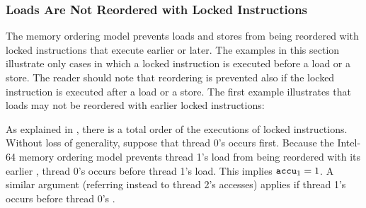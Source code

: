\newpage

\subsubsection*{Loads Are Not Reordered with Locked Instructions}

The memory ordering model prevents loads and stores from being reordered with locked instructions that execute earlier or later.
The examples in this section illustrate only cases in which a locked instruction is executed before a load or a store.
The reader should note that reordering is prevented also if the locked instruction is executed after a load or a store.
\bigbreak
\noindent
The first example illustrates that loads may not be reordered with earlier locked instructions:

\begin{table}[!hbt]
\noindent{}
\caption[Loads Are not Reordered with Locks]{Loads Are not Reordered with Locks \cite[Example 8-9]{ref:Intel}}
\label{tbl:litmus:intel:9}
\end{table}

\noindent
As explained in \cite[Section 8.2.3.8]{ref:Intel}, there is a total order of the executions of locked instructions.
Without loss of generality, suppose that thread 0’s  occurs first.
\bigbreak
\noindent
Because the Intel-64 memory ordering model prevents thread 1’s load from being reordered with its earlier , thread 0’s  occurs before thread 1’s load.
This implies $\texttt{accu}_1 = 1$.
\bigbreak
\noindent
A similar argument (referring instead to thread 2’s accesses) applies if thread 1’s  occurs before thread 0’s .

